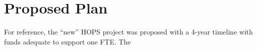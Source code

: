 %
%
\section{Proposed Plan}
\label{sec:prop-plan}

For reference, the ``new'' HOPS project was proposed with
a 4-year timeline with funds adequate to support one FTE.
The 

%
%
